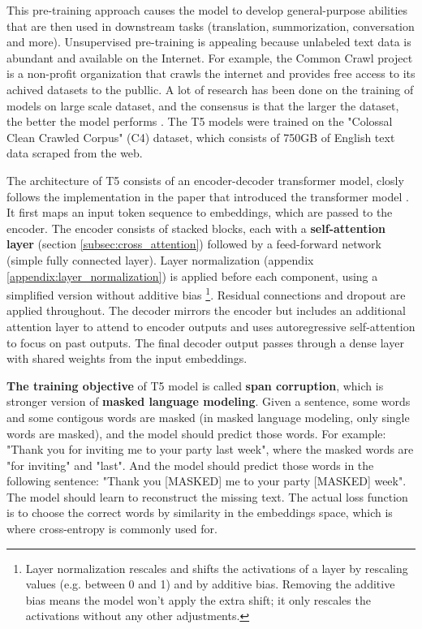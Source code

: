 This pre-training approach causes the model to develop general-purpose abilities that are then used in downstream tasks (translation, summorization, conversation and more). Unsupervised pre-training is appealing because unlabeled text data is abundant and available on the Internet. For example, the Common Crawl project \cite{common_crawl_project} is a non-profit organization that crawls the internet and provides free access to its achived datasets to the publlic. A lot of research has been done on the training of models on large scale dataset, and the consensus is that the larger the dataset, the better the model performs \cite{radford2019language} \cite{jozefowicz2016exploring} \cite{hestness2017deep}. The T5 models were trained on the "Colossal Clean Crawled Corpus" (C4) dataset, which consists of 750GB of English text data scraped from the web.

The architecture of T5 consists of an encoder-decoder transformer model, closly follows the implementation in the paper that introduced the transformer model \cite{transformer}. It first maps an input token sequence to embeddings, which are passed to the encoder. The encoder consists of stacked blocks, each with a \textbf{self-attention layer} (section \ref{subsec:cross_attention}) followed by a feed-forward network (simple fully connected layer). Layer normalization (appendix \ref{appendix:layer_normalization}) is applied before each component, using a simplified version without additive bias \footnote{Layer normalization rescales and shifts the activations of a layer by rescaling values (e.g. between 0 and 1) and by additive bias. Removing the additive bias means the model won't apply the extra shift; it only rescales the activations without any other adjustments.}. Residual connections and dropout are applied throughout. The decoder mirrors the encoder but includes an additional attention layer to attend to encoder outputs and uses autoregressive self-attention to focus on past outputs. The final decoder output passes through a dense layer with shared weights from the input embeddings. 

\textbf{The training objective} of T5 model is called \textbf{span corruption}, which is stronger version of \textbf{masked language modeling}. Given a sentence, some words and some contigous words are masked (in masked language modeling, only single words are masked), and the model should predict those words. For example: "Thank you for inviting me to your party last week", where the masked words are "for inviting" and "last". And the model should predict those words in the following sentence: "Thank you [MASKED] me to your party [MASKED] week". The model should learn to reconstruct the missing text. The actual loss function is to choose the correct words by similarity in the embeddings space, which is where cross-entropy is commonly used for.

